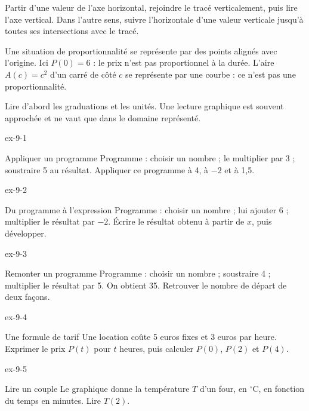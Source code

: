 \begin{savoirfaire}Partir d’une valeur de l’axe horizontal, rejoindre le tracé verticalement, puis lire l’axe vertical. Dans l’autre sens, suivre l’horizontale d’une valeur verticale jusqu’à toutes ses intersections avec le tracé.\end{savoirfaire}
\begin{propriete}Une situation de proportionnalité se représente par des points alignés avec l’origine. Ici $P(0)=6$ : le prix n’est pas proportionnel à la durée. L’aire $A(c)=c^2$ d’un carré de côté $c$ se représente par une courbe : ce n’est pas une proportionnalité.\end{propriete}
\begin{attention}Lire d’abord les graduations et les unités. Une lecture graphique est souvent approchée et ne vaut que dans le domaine représenté.\end{attention}

\clearpage{}
\begin{blocLivre}{ex-9-1}\begin{exercice}[1]{Appliquer un programme}
Programme : choisir un nombre ; le multiplier par 3 ; soustraire 5 au résultat. Appliquer ce programme à 4, à $-2$ et à 1,5.
\end{exercice}\end{blocLivre}
\begin{blocLivre}{ex-9-2}\begin{exercice}[1]{Du programme à l’expression}
Programme : choisir un nombre ; lui ajouter 6 ; multiplier le résultat par $-2$. Écrire le résultat obtenu à partir de $x$, puis développer.
\end{exercice}\end{blocLivre}
\begin{blocLivre}{ex-9-3}\begin{exercice}[1]{Remonter un programme}
Programme : choisir un nombre ; soustraire 4 ; multiplier le résultat par 5. On obtient 35. Retrouver le nombre de départ de deux façons.
\end{exercice}\end{blocLivre}
\begin{blocLivre}{ex-9-4}\begin{exercice}[1]{Une formule de tarif}
Une location coûte 5 euros fixes et 3 euros par heure. Exprimer le prix $P(t)$ pour $t$ heures, puis calculer $P(0)$, $P(2)$ et $P(4)$.
\end{exercice}\end{blocLivre}
\begin{blocLivre}{ex-9-5}\begin{exercice}[1]{Lire un couple}
Le graphique donne la température $T$ d’un four, en $^\circ$C, en fonction du temps en minutes. Lire $T(2)$.
\label{fig-ex-9-5}
\end{exercice}\end{blocLivre}

